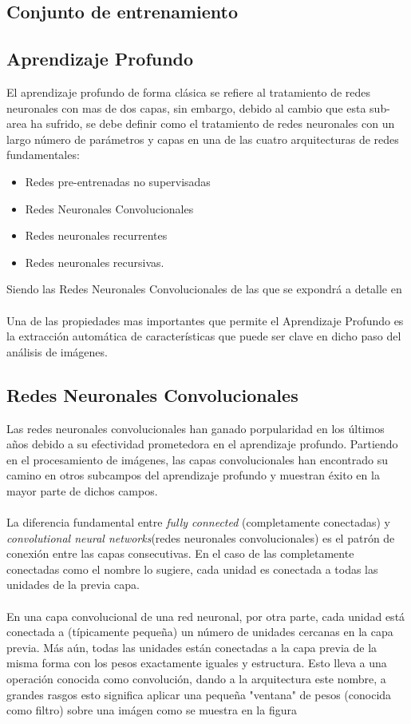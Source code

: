     \subsection{Conjunto de entrenamiento}
    
    
    \subsection{Aprendizaje Profundo}
        El aprendizaje profundo de forma clásica se refiere al tratamiento de redes neuronales con mas de dos capas, sin embargo, debido al cambio que esta sub-area ha sufrido, se debe definir como el tratamiento de redes neuronales con un largo número de parámetros y capas en una de las cuatro arquitecturas de redes fundamentales:
        \begin{itemize}
            \item Redes pre-entrenadas no supervisadas
            \item Redes Neuronales Convolucionales
            \item Redes neuronales recurrentes
            \item Redes neuronales recursivas.
        \end{itemize}
    
    Siendo las Redes Neuronales Convolucionales de las que se expondrá a detalle en  \\%
    \\Una de las propiedades mas importantes que permite el Aprendizaje Profundo es la extracción automática de características que puede ser clave en dicho paso del análisis de imágenes.
    
    \subsection{Redes Neuronales Convolucionales}
    Las redes neuronales convolucionales han ganado porpularidad en los últimos años debido a su efectividad prometedora en el aprendizaje profundo. Partiendo en el procesamiento de imágenes, las capas convolucionales han encontrado su camino en otros subcampos del aprendizaje profundo y muestran éxito en la mayor parte de dichos campos.\\\\ 
    La diferencia fundamental entre \textit{fully connected} (completamente conectadas) y \textit{convolutional neural networks}(redes neuronales convolucionales) es el patrón de conexión entre las capas consecutivas. En el caso de las completamente conectadas como el nombre lo sugiere, cada unidad es conectada a todas las unidades de la previa capa. \\\\
    En una capa convolucional de una red neuronal, por otra parte, cada unidad está conectada a (típicamente pequeña) un número de unidades cercanas en la capa previa. Más aún, todas las unidades están conectadas a la capa previa de la misma forma con los pesos exactamente iguales y estructura. Esto lleva a una operación conocida como convolución, dando a la arquitectura este nombre, a grandes rasgos esto significa aplicar una pequeña "ventana" de pesos (conocida como filtro) sobre una imágen como se muestra en la figura %
    

